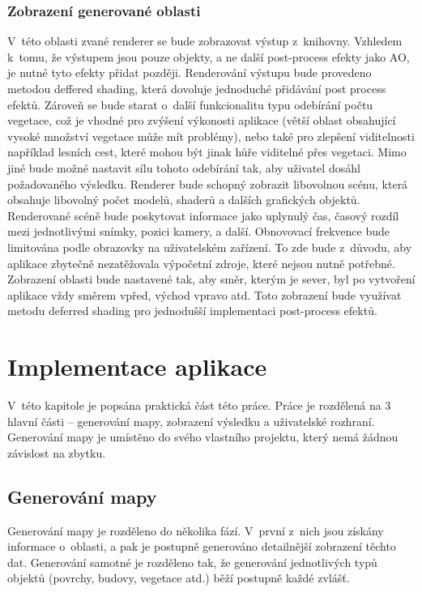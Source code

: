 \subsection*{Zobrazení generované oblasti}
V~této oblasti zvané renderer se bude zobrazovat výstup z~knihovny. Vzhledem k~tomu, že výstupem jsou pouze objekty, a ne další post-process efekty jako AO, je nutné tyto efekty přidat později. Renderování výstupu bude provedeno metodou deffered shading, která dovoluje jednoduché přidávání post process efektů. Zároveň se bude starat o~další funkcionalitu typu odebírání počtu vegetace, což je vhodné pro zvýšení výkonosti aplikace (větší oblast obsahující vysoké množství vegetace může mít problémy), nebo také pro zlepšení viditelnosti například lesních cest, které mohou být jinak hůře viditelné přes vegetaci. Mimo jiné bude možné nastavit sílu tohoto odebírání tak, aby uživatel dosáhl požadovaného výsledku. Renderer bude schopný zobrazit libovolnou scénu, která obsahuje libovolný počet modelů, shaderů a dalších grafických objektů. Renderované scéně bude poskytovat informace jako uplynulý čas, časový rozdíl mezi jednotlivými snímky, pozici kamery, a další. Obnovovací frekvence bude limitována podle obrazovky na uživatelském zařízení. To zde bude z~důvodu, aby aplikace zbytečně nezatěžovala výpočetní zdroje, které nejsou nutně potřebné. Zobrazení oblasti bude nastavené tak, aby směr, kterým je sever, byl po vytvoření aplikace vždy směrem vpřed, východ vpravo atd. Toto zobrazení bude využívat metodu deferred shading pro jednodušší implementaci post-process efektů.

\chapter{Implementace aplikace}
V~této kapitole je popsána praktická část této práce. Práce je rozdělená na 3 hlavní části -- generování mapy, zobrazení výsledku a uživatelské rozhraní. Generování mapy je umístěno do svého vlastního projektu, který nemá žádnou závislost na zbytku.


\section{Generování mapy}
Generování mapy je rozděleno do několika fází. V~první z~nich jsou získány informace o~oblasti, a pak je postupně generováno detailnější zobrazení těchto dat. Generování samotné je rozděleno tak, že generování jednotlivých typů objektů (povrchy, budovy, vegetace atd.) běží postupně každé zvlášť.

